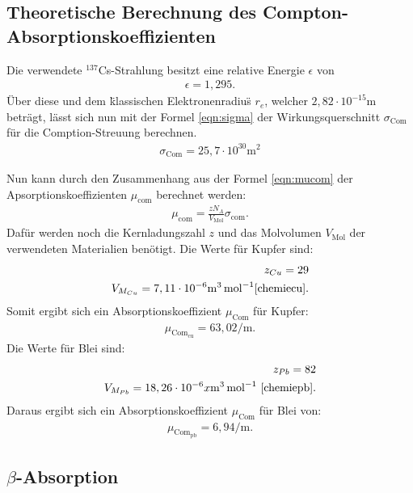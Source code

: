 \subsection{Theoretische Berechnung des Compton-Absorptionskoeffizienten}
Die verwendete $^{137}$Cs-Strahlung besitzt eine relative Energie $\epsilon$ von
\begin{align*}
  \epsilon=1,295.
\end{align*}
Über diese und dem \"klassischen Elektronenradius\" $r_e$, welcher $2,82\cdot10^{-15}\si{\meter}$
beträgt, lässt sich nun mit der Formel \eqref{eqn:sigma}
der Wirkungsquerschnitt $\sigma_\mathrm{Com}$ für die Comption-Streuung
berechnen.
\begin{align*}
\sigma_\mathrm{Com}=25,7\cdot10^{30}\si{\meter\tothe{2}}
\end{align*}

Nun kann durch den Zusammenhang aus der Formel \eqref{eqn:mucom} der
Apsorptionskoeffizienten $\mu_\mathrm{com}$ berechnet werden:
\begin{align}
\mu_\mathrm{com}=\frac{zN_A}{V_\mathrm{Mol}}\sigma_\mathrm{com}.\label{eqn:mucom}
\end{align}
Dafür werden noch die
Kernladungszahl $z$ und das Molvolumen $V_\mathrm{Mol}$ der
verwendeten Materialien benötigt.
Die Werte für Kupfer sind:
\begin{align*}
z_{Cu}=29\\
V_{M_{Cu}}=7,11 \cdot 10^{-6}\si{\meter\tothe{3}\per\mol} \text{\cite{chemiecu}}.
\end{align*}
Somit ergibt sich ein Absorptionskoeffizient $\mu_\mathrm{Com}$ für Kupfer:
\begin{align*}
  \mu_\mathrm{Com_{cu}}={63,02\si{\per\meter}}.
\end{align*}
Die Werte für Blei sind:
\begin{align*}
z_{Pb}=82\\
V_{M_{Pb}}=18,26 \cdot 10^{-6}x\si{\meter\tothe{3}\per\mol} \text{ \cite{chemiepb}}.
\end{align*}
Daraus ergibt sich ein Absorptionskoeffizient $\mu_\mathrm{Com}$ für Blei von:
\begin{align*}
  \mu_\mathrm{Com_{pb}}={6,94\si{\per\meter}}.
\end{align*}

\subsection{ $β$-Absorption}

